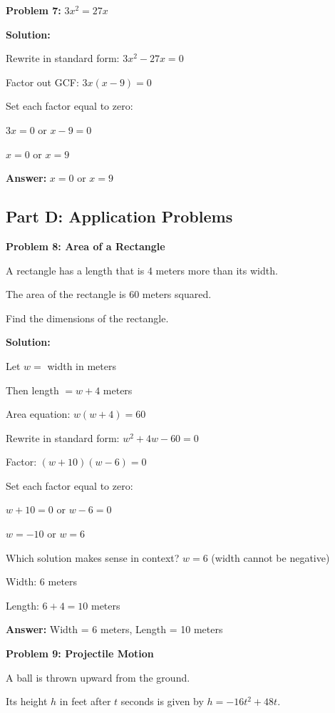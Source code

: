 \documentclass[12pt]{article}
\begin{document}
		\textbf{Problem 7:} $3x^2 = 27x$
		
		\textbf{Solution:}
		
		Rewrite in standard form: $3x^2 - 27x = 0$
		
		Factor out GCF: $3x(x - 9) = 0$
		
		Set each factor equal to zero:
		
		$3x = 0$ or $x - 9 = 0$
		
		$x = 0$ or $x = 9$
		
		\textbf{Answer:} $x = 0$ or $x = 9$

	\newpage

	\subsection*{Part D: Application Problems}

		\textbf{Problem 8: Area of a Rectangle}
		
		A rectangle has a length that is 4 meters more than its width.
		
		The area of the rectangle is 60 meters squared.
		
		Find the dimensions of the rectangle.
		
		\textbf{Solution:}
		
		Let $w = $ width in meters
		
		Then length $= w + 4$ meters
		
		Area equation: $w(w + 4) = 60$
		
		Rewrite in standard form: $w^2 + 4w - 60 = 0$
		
		Factor: $(w + 10)(w - 6) = 0$
		
		Set each factor equal to zero:
		
		$w + 10 = 0$ or $w - 6 = 0$
		
		$w = -10$ or $w = 6$
		
		Which solution makes sense in context? $w = 6$ (width cannot be negative)
		
		Width: 6 meters
		
		Length: $6 + 4 = 10$ meters
		
		\textbf{Answer:} Width = 6 meters, Length = 10 meters

		\vspace{0.5cm}

		\textbf{Problem 9: Projectile Motion}
		
		A ball is thrown upward from the ground.
		
		Its height $h$ in feet after $t$ seconds is given by $h = -16t^2 + 48t$.
		
\end{document}
